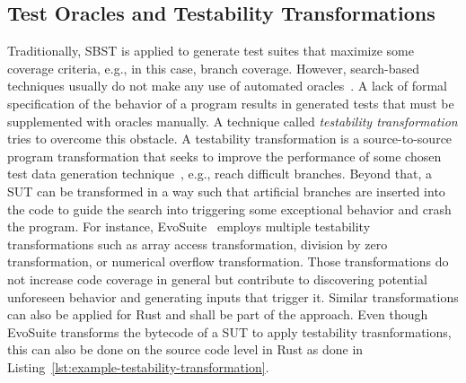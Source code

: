 \documentclass{article}
\begin{document}

\subsection{Test Oracles and Testability Transformations}
Traditionally, \ac{SBST} is applied to generate test suites that maximize some coverage criteria, e.g., in this case, branch coverage. However, search-based techniques usually do not make any use of automated oracles~\cite{Fraser2013}. A lack of formal specification of the behavior of a program results in generated tests that must be supplemented with oracles manually. A technique called \textit{testability transformation} tries to overcome this obstacle. A testability transformation is a source-to-source program transformation that seeks to improve the performance of some chosen test data generation technique~\cite{Harman2004}, e.g., reach difficult branches. Beyond that, a \ac{SUT} can be transformed in a way such that artificial branches are inserted into the code to guide the search into triggering some exceptional behavior and crash the program. For instance, EvoSuite~\cite{Fraser2013} employs multiple testability transformations such as array access transformation, division by zero transformation, or numerical overflow transformation. Those transformations do not increase code coverage in general but contribute to discovering potential unforeseen behavior and generating inputs that trigger it. Similar transformations can also be applied for Rust and shall be part of the approach. Even though EvoSuite transforms the bytecode of a \ac{SUT} to apply testability trasnformations, this can also be done on the source code level in Rust as done in Listing~\ref{lst:example-testability-transformation}.

\end{document}
